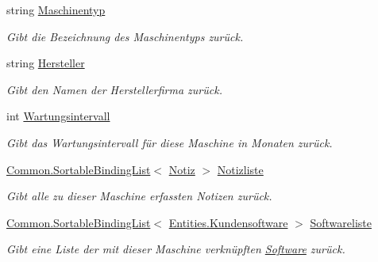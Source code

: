 \begin{DoxyCompactItemize}
string \hyperlink{class_products_1_1_model_1_1_entities_1_1_kundenmaschine_a0a787c4f799fde2242d771ea52507967}{Maschinentyp}
\begin{DoxyCompactList}\small\item\em Gibt die Bezeichnung des Maschinentyps zurück. \end{DoxyCompactList}\item 
string \hyperlink{class_products_1_1_model_1_1_entities_1_1_kundenmaschine_ab8e784d9d251ee455c768a525d22bee2}{Hersteller}
\begin{DoxyCompactList}\small\item\em Gibt den Namen der Herstellerfirma zurück. \end{DoxyCompactList}\item 
int \hyperlink{class_products_1_1_model_1_1_entities_1_1_kundenmaschine_a44f1b2970eba6205ed9447e3657c40cb}{Wartungsintervall}
\begin{DoxyCompactList}\small\item\em Gibt das Wartungsintervall für diese Maschine in Monaten zurück. \end{DoxyCompactList}\item 
\hyperlink{class_products_1_1_common_1_1_sortable_binding_list}{Common.\+Sortable\+Binding\+List}$<$ \hyperlink{class_products_1_1_model_1_1_entities_1_1_notiz}{Notiz} $>$ \hyperlink{class_products_1_1_model_1_1_entities_1_1_kundenmaschine_ab696f2318c6dbedac87c870dd764365b}{Notizliste}
\begin{DoxyCompactList}\small\item\em Gibt alle zu dieser Maschine erfassten Notizen zurück. \end{DoxyCompactList}\item 
\hyperlink{class_products_1_1_common_1_1_sortable_binding_list}{Common.\+Sortable\+Binding\+List}$<$ \hyperlink{class_products_1_1_model_1_1_entities_1_1_kundensoftware}{Entities.\+Kundensoftware} $>$ \hyperlink{class_products_1_1_model_1_1_entities_1_1_kundenmaschine_aebe0cd49118c3acd4d30c2a5bc3886a7}{Softwareliste}
\begin{DoxyCompactList}\small\item\em Gibt eine Liste der mit dieser Maschine verknüpften \hyperlink{class_products_1_1_model_1_1_entities_1_1_software}{Software} zurück. \end{DoxyCompactList}\item 

\end{DoxyCompactItemize}
